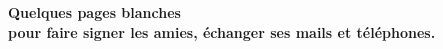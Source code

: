\begin{center}
{\Huge\textbf{Quelques pages blanches\\ pour faire signer les ami\textperiodcentered{}e\textperiodcentered{}s, échanger ses mails et téléphones.}}
\end{center}
\vspace{2mm}

\vfill
\newpage
\mbox{ }
\vfill
\newpage
